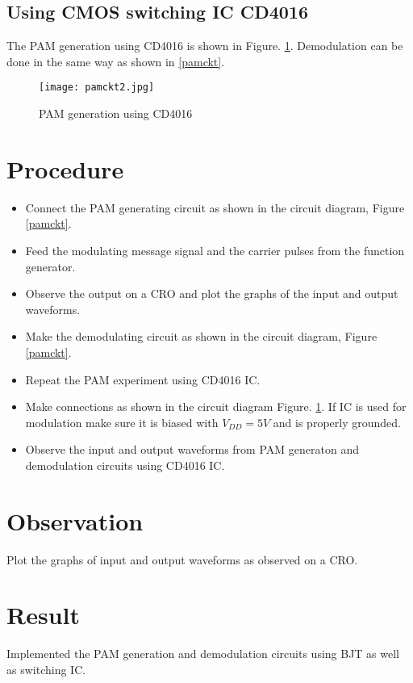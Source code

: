 \subsection*{Using CMOS switching IC CD4016}
The PAM generation using CD4016 is shown in Figure. \ref{pamckt2}. Demodulation can be done in the same way as shown in \ref{pamckt}.

\begin{figure}
\texttt{[image: pamckt2.jpg]}
\caption{PAM generation using CD4016}
\label{pamckt2}
\end{figure}

\section*{Procedure}
\begin{itemize}
\item
Connect the PAM generating circuit as shown in the circuit diagram, Figure \ref{pamckt}.
\item
Feed the modulating message signal and the carrier pulses from the function generator.
\item
Observe the output on a CRO and plot the graphs of the input and output waveforms.
\item
Make the demodulating circuit as shown in the circuit diagram, Figure \ref{pamckt}.
\item
Repeat the PAM experiment using CD4016 IC.
\item
Make connections as shown in the circuit diagram Figure. \ref{pamckt2}. If IC is used for modulation make sure it is biased with $V_{DD}=5V$ and is properly grounded.
\item
Observe the input and output waveforms from PAM generaton and demodulation circuits using CD4016 IC.

\end{itemize}
\section*{Observation}
Plot the graphs of input and output waveforms as observed on a CRO.
\section*{Result}

Implemented the PAM generation and demodulation circuits using BJT as well as switching IC.